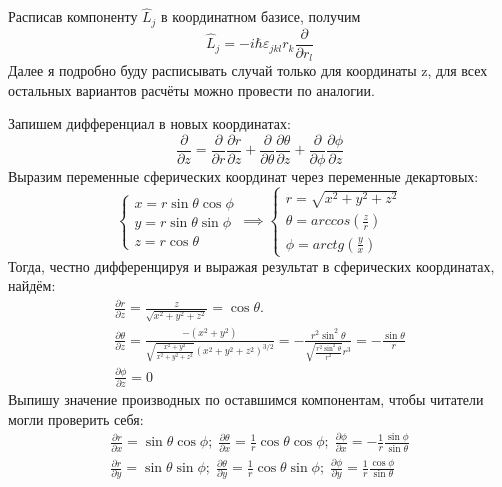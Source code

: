 Расписав компоненту $\hat{L}_j$ в координатном базисе, получим 
\[
\hat{L}_j = -i\hbar\varepsilon_{jkl}r_k\frac{\partial}{\partial r_l}
\]
Далее я подробно буду расписывать случай только для координаты z, для всех остальных вариантов расчёты можно провести по аналогии. 

Запишем дифференциал в новых координатах:
\[
\frac{\partial }{\partial z} = \frac{\partial}{\partial r}\frac{\partial r}{\partial z} + \frac{\partial}{\partial \theta}\frac{\partial \theta}{\partial z} + \frac{\partial}{\partial \phi}\frac{\partial \phi}{\partial z}
\]
Выразим переменные сферических координат через переменные декартовых:
\begin{equation*}
    \begin{cases}
        x = r\sin\theta\cos\phi\\
        y = r\sin\theta\sin\phi\\
        z = r\cos\theta
    \end{cases}
    \implies
    \begin{cases}
        r = \sqrt{x^2 + y^2 + z^2}\\
        \theta = arccos(\frac{z}{r})\\
        \phi = arctg(\frac{y}{x})
    \end{cases}
\end{equation*}
Тогда, честно дифференцируя и выражая результат в сферических координатах, найдём:
\begin{gather*}
\frac{\partial r}{\partial z} = \frac{z}{\sqrt{x^2 + y^2 + z^2}} = \cos\theta.\\
\frac{\partial \theta}{\partial z} = \frac{-(x^2+y^2)}{\sqrt{\frac{x^2 + y^2}{x^2+y^2+z^2}}(x^2+y^2+z^2)^{3/2}}= -\frac{r^2\sin^2\theta}{\sqrt{\frac{r^2\sin^2\theta}{r^2}}r^3} = -\frac{\sin\theta}{r} \\
\frac{\partial \phi}{\partial z} = 0
\end{gather*}
Выпишу значение производных по оставшимся компонентам, чтобы читатели могли проверить себя:
\begin{gather*}
\frac{\partial r}{\partial x} = \sin\theta\cos\phi; \; \frac{\partial \theta}{\partial x} = \frac{1}{r}\cos\theta\cos\phi; \; \frac{\partial \phi}{\partial x} = -\frac{1}{r}\frac{\sin\phi}{\sin\theta}\\
\frac{\partial r}{\partial y} = \sin\theta\sin\phi; \; \frac{\partial \theta}{\partial y} = \frac{1}{r}\cos\theta\sin\phi; \; \frac{\partial \phi}{\partial y} = \frac{1}{r}\frac{\cos\phi}{\sin\theta}
\end{gather*}

